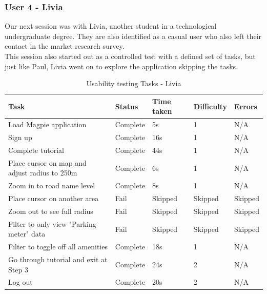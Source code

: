 \subsubsection{User 4 - Livia}
Our next session was with Livia, another student in a technological undergraduate degree. They are also identified as a casual user who also left their contact in the market research survey.\\
This session also started out as a controlled test with a defined set of tasks, but just like Paul, Livia went on to explore the application skipping the tasks.\\
\begin{table}[h!]
    \centering
    \caption{Usability testing Tasks - Livia}
    \begin{tabular}{|p{}|p{}|p{}|p{}|p{}|}
        \hline
        \textbf{Task}                                 & \textbf{Status} & \textbf{Time taken} & \textbf{Difficulty} & \textbf{Errors} \\
        \hline
        Load Magpie application                       & Complete        & 5s                  & 1                   & N/A             \\
        \hline
        Sign up                                       & Complete        & 16s                 & 1                   & N/A             \\
        \hline
        Complete tutorial                             & Complete        & 44s                 & 1                   & N/A             \\
        \hline
        Place cursor on map and adjust radius to 250m & Complete        & 6s                  & 1                   & N/A             \\
        \hline
        Zoom in to road name level                    & Complete        & 8s                  & 1                   & N/A             \\
        \hline
        Place cursor on another area                  & Fail            & Skipped             & Skipped             & Skipped         \\
        \hline
        Zoom out to see full radius                   & Fail            & Skipped             & Skipped             & Skipped         \\
        \hline
        Filter to only view "Parking meter" data      & Fail            & Skipped             & Skipped             & Skipped         \\
        \hline
        Filter to toggle off all amenities            & Complete        & 18s                 & 1                   & N/A             \\
        \hline
        Go through tutorial and exit at Step 3        & Complete        & 24s                 & 2                   & N/A             \\
        \hline
        Log out                                       & Complete        & 20s                 & 2                   & N/A             \\
        \hline
    \end{tabular}
\end{table}\\
